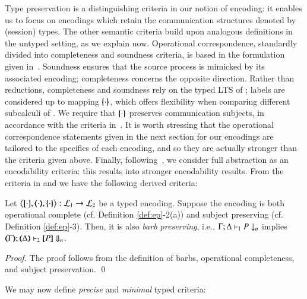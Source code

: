 \noi Type preservation is a distinguishing criteria in our notion of encoding: 
it enables us to focus on encodings which retain the communication structures denoted by (session) types.
The other semantic
criteria build upon analogous definitions in the untyped setting, as we explain now. 
Operational correspondence, standardly divided into completeness and soundness criteria, is based
in the formulation given in~\cite{DBLP:journals/iandc/Gorla10,DBLP:conf/icalp/LanesePSS10}. 
Soundness ensures that the source process is mimicked 
by its associated encoding; completeness concerns the opposite direction.
Rather than reductions, completeness and soundness rely on 
the typed LTS of ; labels are considered up to  mapping
$\{\!\!\{\cdot\}\!\!\}$, which offers flexibility when comparing different subcalculi of \HOp.
We require that $\{\!\!\{\cdot\}\!\!\}$ preserves communication subjects, in accordance with the
criteria in~\cite{DBLP:conf/icalp/LanesePSS10}.
It is worth stressing that 
the operational correspondence statements given in
the next section for our  encodings 
are tailored to the specifics of each encoding, and so they
are actually stronger than the criteria given above.
Finally, following~\cite{SangiorgiD:expmpa,DBLP:conf/lics/PalamidessiSVV06,Yoshida96},
we consider full abstraction as an encodability criteria: this results into 
stronger encodability results. 
From the criteria in  and 
we have the following derived criteria: 

\begin{proposition}\rm
	\label{p:barbpres}
	Let
	$\enco{\map{\cdot}, \mapt{\cdot}, \mapa{\cdot}}: \tyl{L}_1 \to \tyl{L}_2$
	be a typed encoding.
	Suppose the encoding is both
	operational complete (cf. Definition \ref{def:ep}-2(a)) 
	and subject preserving (cf. Definition \ref{def:ep}-3).
	Then, it is also \emph{barb preserving}, i.e., 
	$\Gamma; \Delta \vdash_1 P \downarrow_{n}$
	implies
	$\mapt{\Gamma}; \mapt{\Delta} \proves_2 \map{P} \Barb{n}$.
\end{proposition}

\begin{proof}
	The proof follows from the definition of barbs,
	operational completeness, and subject preservation.
	\qed
\end{proof}

We may now define \emph{precise} and \emph{minimal} typed criteria: 

